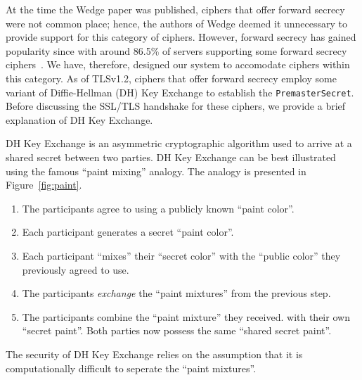 \documentclass[../../main.tex]{subfiles}
\begin{document}
At the time the Wedge paper was published, ciphers that offer forward
secrecy were not common place; hence, the authors of Wedge deemed it
unnecessary to provide support for this category of ciphers. However,
forward secrecy has gained popularity since with around 86.5\% of
servers supporting some forward secrecy ciphers~\cite{fs_stats}. We have, therefore,
designed our system to accomodate ciphers within this category. As of
TLSv1.2, ciphers that offer forward secrecy employ some variant of
Diffie-Hellman (DH) Key Exchange to establish the
\texttt{PremasterSecret}. Before discussing the SSL/TLS handshake for
these ciphers, we provide a brief explanation of DH Key Exchange.


DH Key Exchange is an asymmetric cryptographic algorithm used to
arrive at a shared secret between two parties. DH Key Exchange can be
best illustrated using the famous ``paint mixing'' analogy. The
analogy is presented in Figure~\ref{fig:paint}.
\begin{enumerate}
  \item The participants agree to using a publicly known ``paint
    color''.
  \item Each participant generates a secret ``paint color''.
  \item Each participant ``mixes'' their ``secret color'' with the
    ``public color'' they previously agreed to use.
  \item The participants \textit{exchange} the ``paint mixtures'' from
    the previous step.
  \item The participants combine the ``paint mixture'' they received.
    with their own ``secret paint''. Both parties now possess the same
    ``shared secret paint''.
\end{enumerate}
The security of DH Key Exchange relies on the assumption that it is
computationally difficult to seperate the ``paint mixtures''.
\end{document}
